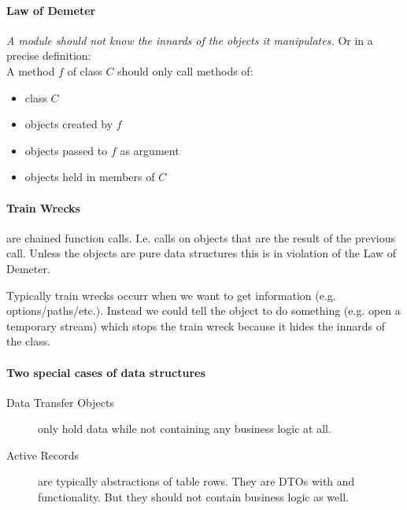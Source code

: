 \documentclass[a4paper, twocolumn]{article}
\newcommand{\code}[1]{\texttt{\color{black}{#1}}}
\begin{document}
\paragraph{Law of Demeter}
\textit{A module should not know the innards of the objects it manipulates.} Or in a precise definition:\\
A method $f$ of class $C$ should only call methods of:
\begin{itemize}
	\item class $C$
	\item objects created by $f$
	\item objects passed to $f$ as argument
	\item objects held in members of $C$
\end{itemize}

\paragraph{Train Wrecks} are chained function calls. I.e. calls on objects that are the result of the previous call. Unless the objects are pure data structures this is in violation of the Law of Demeter.

Typically train wrecks occurr when we want to get information (e.g. options/paths/etc.). Instead we could tell the object to do something (e.g. open a temporary stream) which stops the train wreck because it hides the innards of the class.

\paragraph{Two special cases of data structures}
\begin{description}
	\item[Data Transfer Objects] only hold data while not containing any business logic at all.
	\item[Active Records] are typically abstractions of table rows. They are DTOs with \code{load} and \code{save} functionality. But they should not contain business logic as well.
\end{description}
\end{document}
